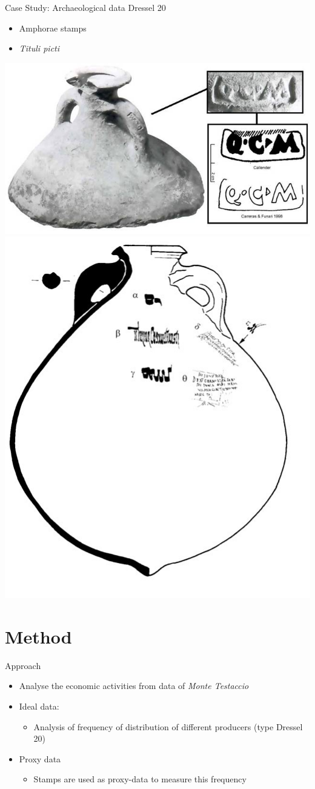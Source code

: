 \documentclass[12pt, handout=show,notes=show]{beamer}
\begin{document}
\begin{frame}{Case Study: Archaeological data}
Dressel 20\\
\begin{itemize}
\item Amphorae stamps
\item \emph{Tituli picti}
\end{itemize}

\begin{center}
		\includegraphics[height=0.3\textwidth]{./amphorae1.jpg}
		\hfil \includegraphics[height=0.3\textwidth]{./amphora.jpg}\\
		\vfill
	
\end{center}		

\end{frame}

\section{Method}

\begin{frame}{Approach}
\begin{itemize}
\item Analyse the economic activities from data of \emph{Monte Testaccio}
\item Ideal data:
\begin{itemize}
\item Analysis of frequency of distribution of different producers (type Dressel 20)
\end{itemize}
\item Proxy data
\begin{itemize}
\item Stamps are used as proxy-data to measure this frequency   
\end{itemize}
\end{itemize}
\end{frame}
\end{document}
